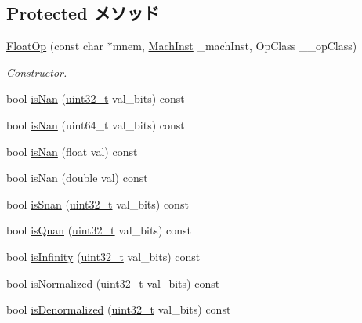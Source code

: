 \subsection*{Protected メソッド}
\begin{DoxyCompactItemize}
\item 
\hyperlink{classPowerISA_1_1FloatOp_ab0692bece3bc7d9c6e04bc5526be8eef}{FloatOp} (const char $\ast$mnem, \hyperlink{namespacePowerISA_a301c22ea09fa33dcfe6ddf22f203699c}{MachInst} \_\-machInst, OpClass \_\-\_\-opClass)
\begin{DoxyCompactList}\small\item\em Constructor. \item\end{DoxyCompactList}\item 
bool \hyperlink{classPowerISA_1_1FloatOp_a221eadd0925a6d2fa526bdbaaebfac93}{isNan} (\hyperlink{Type_8hh_a435d1572bf3f880d55459d9805097f62}{uint32\_\-t} val\_\-bits) const 
\item 
bool \hyperlink{classPowerISA_1_1FloatOp_a4791bbd283b180a0b56d02210a840dc9}{isNan} (uint64\_\-t val\_\-bits) const 
\item 
bool \hyperlink{classPowerISA_1_1FloatOp_a677fa1a2293dd5a24696aeb2efe15d3b}{isNan} (float val) const 
\item 
bool \hyperlink{classPowerISA_1_1FloatOp_a79713b94dbd75e37661e49975700b510}{isNan} (double val) const 
\item 
bool \hyperlink{classPowerISA_1_1FloatOp_a250dfcca4b8f6c835e148def7dc24ca8}{isSnan} (\hyperlink{Type_8hh_a435d1572bf3f880d55459d9805097f62}{uint32\_\-t} val\_\-bits) const 
\item 
bool \hyperlink{classPowerISA_1_1FloatOp_a6dc0371ab6b570e02b59e222333f00d5}{isQnan} (\hyperlink{Type_8hh_a435d1572bf3f880d55459d9805097f62}{uint32\_\-t} val\_\-bits) const 
\item 
bool \hyperlink{classPowerISA_1_1FloatOp_a7543c1770a8718bc8f37b57f24249590}{isInfinity} (\hyperlink{Type_8hh_a435d1572bf3f880d55459d9805097f62}{uint32\_\-t} val\_\-bits) const 
\item 
bool \hyperlink{classPowerISA_1_1FloatOp_a6d5c7457ddf585ba5f3e4889b6d462f3}{isNormalized} (\hyperlink{Type_8hh_a435d1572bf3f880d55459d9805097f62}{uint32\_\-t} val\_\-bits) const 
\item 
bool \hyperlink{classPowerISA_1_1FloatOp_a4b69327a295ab68c9afab2f035119394}{isDenormalized} (\hyperlink{Type_8hh_a435d1572bf3f880d55459d9805097f62}{uint32\_\-t} val\_\-bits) const 
\item 

\end{DoxyCompactItemize}
